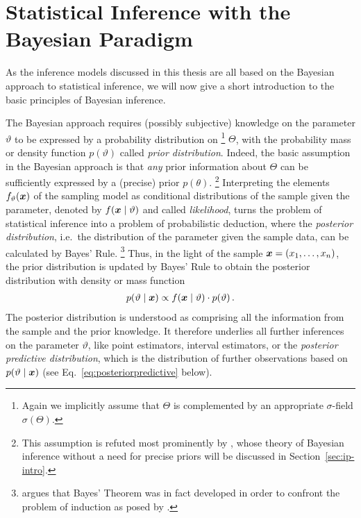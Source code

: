 \section{Statistical Inference with the Bayesian Paradigm}
\label{sec:bayes-inference}

As the inference models discussed in this thesis are all based on the Bayesian approach to statistical inference,
we will now give a short introduction to the basic principles of Bayesian inference.

The Bayesian approach requires (possibly subjective) knowledge on the parameter $\vartheta$ to be expressed by a probability distribution on%
\footnote{Again we implicitly assume that $\Theta$ is complemented by an appropriate $\sigma$-field $\sigma(\Theta)$.}
$\Theta$, with the probability mass or density function $p(\vartheta)$ called \emph{prior distribution}.
Indeed, the basic assumption in the Bayesian approach is that \emph{any} prior information about $\Theta$
can be sufficiently expressed by a (precise) prior $p(\theta)$.%
\footnote{This assumption is refuted most prominently by \textcite{1991:walley},
whose theory of Bayesian inference without a need for precise priors will be discussed in Section~\ref{sec:ip-intro}.}
Interpreting the elements $f_\vartheta({\bm x})$ of the sampling model as conditional distributions of the sample given the parameter,
denoted by $f({\bm x}\mid\vartheta)$ and called \emph{likelihood},
turns the problem of statistical inference into a problem of probabilistic deduction,
where the \emph{posterior distribution}, i.e.\ the distribution of the parameter given the sample data,
can be calculated by Bayes' Rule.%
\footnote{\citeauthor{1987:gillies}  argues
that Bayes' Theorem was in fact developed in order to confront the problem of induction as posed by \textcite{1739:hume}.}
Thus, in the light of the sample ${\bm x}= (x_1, \ldots, x_n)$, the prior distribution is updated by Bayes' Rule
to obtain the posterior distribution with density or mass function
\begin{align}
\label{eq:bayesrule}
p(\vartheta\mid{\bm x}) \propto f({\bm x}\mid\vartheta) \cdot p(\vartheta)\,.
\end{align}
The posterior distribution is understood as comprising all the information from the sample and the prior knowledge.
It therefore underlies all further inferences on the parameter $\vartheta$,
like point estimators, interval estimators,
or the \emph{posterior predictive distribution},
which is the distribution of further observations based on $p(\vartheta\mid{\bm x})$
(see Eq.~\eqref{eq:posteriorpredictive} below).



